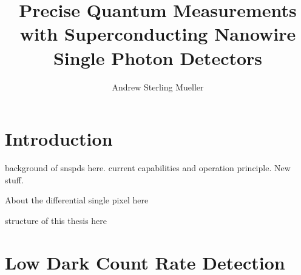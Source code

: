 \documentclass[11pt]{caltech_thesis} %
\begin{document}
\title{Precise Quantum Measurements with Superconducting Nanowire Single Photon Detectors}
\author{Andrew Sterling Mueller}
\address{Pasadena, California}                     
       




\maketitle[logo]

\begin{acknowledgements}   
    
\end{acknowledgements}

\begin{abstract}
   
\end{abstract}

\begin{publishedcontent}

\end{publishedcontent}

\tableofcontents
\listoffigures
\listoftables
\printnomenclature
\mainmatter

\hypertarget{introduction}{%
\chapter{Introduction}\label{introduction}}

background of snspds here. current capabilities and operation principle. New stuff.

About the differential single pixel here

structure of this thesis here

\hypertarget{low-dark-count-rate-detection}{%
\chapter{Low Dark Count Rate Detection}\label{low-dark-count-rate-detection}}
\end{document}
